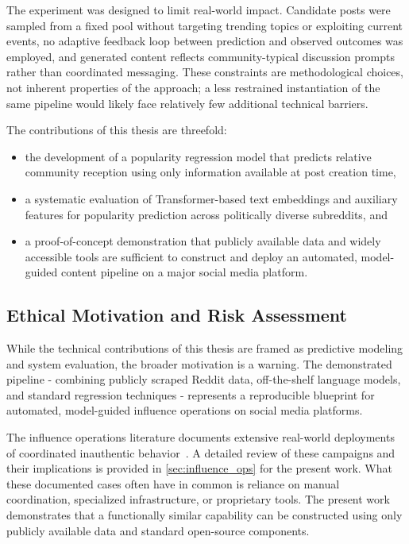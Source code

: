 The experiment was designed to limit real-world impact. Candidate posts were sampled from a fixed pool without targeting trending topics or exploiting current events, no adaptive feedback loop between prediction and observed outcomes was employed, and generated content reflects community-typical discussion prompts rather than coordinated messaging. These constraints are methodological choices, not inherent properties of the approach; a less restrained instantiation of the same pipeline would likely face relatively few additional technical barriers.

The contributions of this thesis are threefold:
\begin{itemize}
    \item the development of a popularity regression model that predicts relative community reception using only information available at post creation time,
    \item a systematic evaluation of Transformer-based text embeddings and auxiliary features for popularity prediction across politically diverse subreddits, and
    \item a proof-of-concept demonstration that publicly available data and widely accessible tools are sufficient to construct and deploy an automated, model-guided content pipeline on a major social media platform.
\end{itemize}

\subsection*{Ethical Motivation and Risk Assessment}

While the technical contributions of this thesis are framed as predictive modeling and system evaluation, the broader motivation is a warning. The demonstrated pipeline - combining publicly scraped Reddit data, off-the-shelf language models, and standard regression techniques - represents a reproducible blueprint for automated, model-guided influence operations on social media platforms.

The influence operations literature documents extensive real-world deployments of coordinated inauthentic behavior~\cite{woolley2018computational, linvill2020troll}. 
A detailed review of these campaigns and their implications is provided in \autoref{sec:influence_ops} for the present work.
What these documented cases often have in common is reliance on manual coordination, specialized infrastructure, or proprietary tools. The present work demonstrates that a functionally similar capability can be constructed using only publicly available data and standard open-source components.

